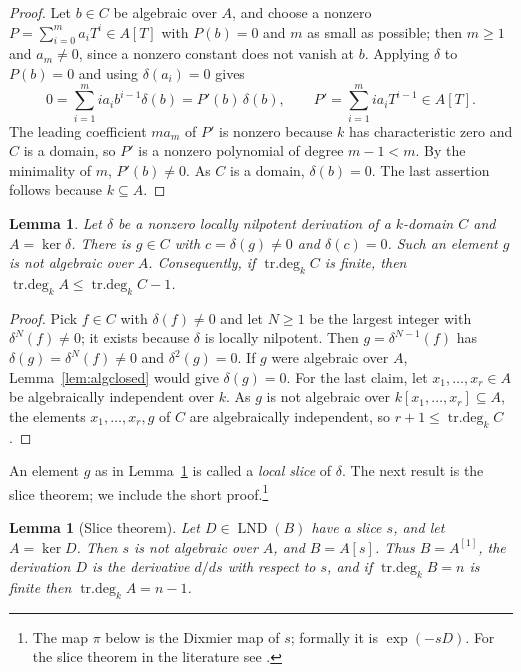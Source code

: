 \documentclass[11pt]{amsart}
\newtheorem{lemma}[theorem]{Lemma}
\theoremstyle{definition}
\DeclareMathOperator{\LND}{LND}
\DeclareMathOperator{\trdeg}{tr.deg}
\newcommand{\td}[1]{\trdeg_k #1}
\begin{document}
\begin{proof}
Let $b\in C$ be algebraic over $A$, and choose a nonzero $P=\sum_{i=0}^m a_iT^i\in A[T]$ with $P(b)=0$ and $m$ as small as possible; then $m\ge1$ and $a_m\neq0$, since a nonzero constant does not vanish at $b$. Applying $\delta$ to $P(b)=0$ and using $\delta(a_i)=0$ gives
\[
0=\sum_{i=1}^m ia_ib^{i-1}\delta(b)=P'(b)\,\delta(b),\qquad P'=\sum_{i=1}^m ia_iT^{i-1}\in A[T].
\]
The leading coefficient $ma_m$ of $P'$ is nonzero because $k$ has characteristic zero and $C$ is a domain, so $P'$ is a nonzero polynomial of degree $m-1<m$. By the minimality of $m$, $P'(b)\neq0$. As $C$ is a domain, $\delta(b)=0$. The last assertion follows because $k\subseteq A$.
\end{proof}

\begin{lemma}\label{lem:localslice}
Let $\delta$ be a nonzero locally nilpotent derivation of a $k$-domain $C$ and $A=\ker\delta$. There is $g\in C$ with $c=\delta(g)\neq0$ and $\delta(c)=0$. Such an element $g$ is not algebraic over $A$. Consequently, if $\td{C}$ is finite, then $\td{A}\le\td{C}-1$.
\end{lemma}

\begin{proof}
Pick $f\in C$ with $\delta(f)\neq0$ and let $N\ge1$ be the largest integer with $\delta^N(f)\neq0$; it exists because $\delta$ is locally nilpotent. Then $g=\delta^{N-1}(f)$ has $\delta(g)=\delta^N(f)\neq0$ and $\delta^2(g)=0$. If $g$ were algebraic over $A$, Lemma~\ref{lem:algclosed} would give $\delta(g)=0$. For the last claim, let $x_1,\dots,x_r\in A$ be algebraically independent over $k$. As $g$ is not algebraic over $k[x_1,\dots,x_r]\subseteq A$, the elements $x_1,\dots,x_r,g$ of $C$ are algebraically independent, so $r+1\le\td{C}$.
\end{proof}

An element $g$ as in Lemma~\ref{lem:localslice} is called a \emph{local slice} of $\delta$. The next result is the slice theorem; we include the short proof.\footnote{The map $\pi$ below is the Dixmier map of $s$; formally it is $\exp(-sD)$. For the slice theorem in the literature see \cite[Chapter~1]{Fre17}.}

\begin{lemma}[Slice theorem]\label{lem:slice}
Let $D\in\LND(B)$ have a slice $s$, and let $A=\ker D$. Then $s$ is not algebraic over $A$, and $B=A[s]$. Thus $B=A^{[1]}$, the derivation $D$ is the derivative $d/ds$ with respect to $s$, and if $\td{B}=n$ is finite then $\td{A}=n-1$.
\end{lemma}
\end{document}
